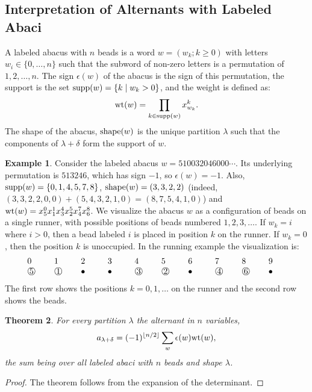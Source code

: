 \documentclass[11pt]{amsproc}
\newtheorem{theorem}{Theorem}[subsection]
\theoremstyle{definition}
\theoremstyle{example}
\newtheorem{example}[theorem]{Example}
\newcommand{\supp}{\textup{supp}}
\newcommand{\wt}{\textup{wt}}
\newcommand{\shape}{\textup{shape}}
\renewcommand{\circled}[1]{\raisebox{.5pt}{\textcircled{\raisebox{-.9pt} {#1}}}}
\begin{document}
\subsection{Interpretation of Alternants with Labeled Abaci}
\label{sec:abaci}
A labeled abacus with $n$ beads is a word $w=(w_k; k\geq 0)$ with letters $w_i\in \{0,\dotsc,n\}$ such that the subword of non-zero letters is a permutation of $1,2,\dotsc,n$.
The sign $\epsilon(w)$ of the abacus is the sign of this permutation, the support is the set $\supp(w)=\{k\mid w_k>0\}$, and the weight is defined as:
\begin{displaymath}
  \wt(w) = \prod_{k\in \supp(w)} x_{w_k}^k.
\end{displaymath}
The shape of the abacus, $\shape(w)$ is the unique partition $\lambda$ such that the components of $\lambda+\delta$ form the support of $w$.
\begin{example}
  Consider the labeled abacus $w=510032046000\dotsb$.
  Its underlying permutation is $513246$, which has sign $-1$, so $\epsilon(w)=-1$.
  Also, $\supp(w)=\{0,1,4,5,7,8\}$, $\shape(w)=(3,3,2,2)$ (indeed, $(3,3,2,2,0,0)+(5,4,3,2,1,0)=(8,7,5,4,1,0)$) and $\wt(w)=x_5^0x_1^1x_3^4x_2^5x_4^7x_6^8$.
  We visualize the abacus $w$ as a configuration of beads on a single runner, with possible positions of beads numbered $1, 2, 3, \dotsc$.
  If $w_k=i$ where $i>0$, then a bead labeled $i$ is placed in position $k$ on the runner.
  If $w_k=0$, then the position $k$ is unoccupied.
  In the running example the visualization is:
  \begin{displaymath}
    \begin{tabular}{*{10}{p{0.7cm}}}
      0 & 1 & 2 & 3 & 4 & 5 & 6 & 7 & 8 & 9\\
      \circled{5} & \circled{1} & $\bullet$ & $\bullet$ & \circled{3} & \circled{2} & $\bullet$ & \circled{4} & \circled{6} & $\bullet$
    \end{tabular}
  \end{displaymath}
  The first row shows the positions $k=0,1,\dotsc$ on the runner and the second row shows the beads.
\end{example}
\begin{theorem}
  \label{theorem:abacus-alt}
  For every partition $\lambda$ the alternant in $n$  variables,
  \begin{displaymath}
    a_{\lambda+\delta} = (-1)^{\lfloor n/2\rfloor} \sum_w \epsilon(w)\wt(w),
  \end{displaymath}
  the sum being over all labeled abaci with $n$ beads and shape $\lambda$.
\end{theorem}
\begin{proof}
  The theorem follows from the expansion of the determinant.
\end{proof}
\end{document}
